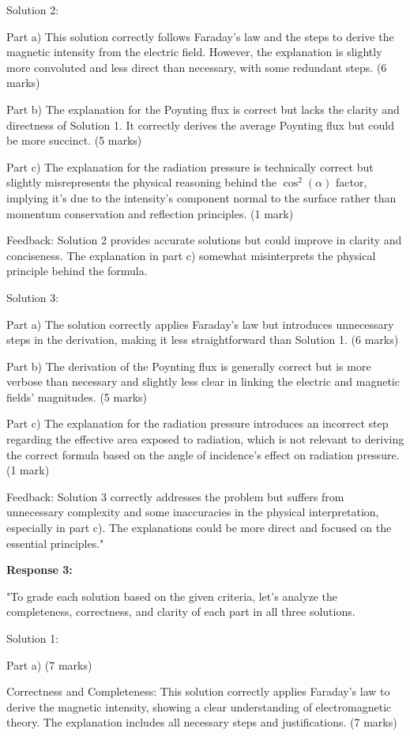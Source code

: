 \documentclass[a4paper,11pt]{article}
\begin{document}
Solution 2:

Part a) This solution correctly follows Faraday's law and the steps to derive the magnetic intensity from the electric field. However, the explanation is slightly more convoluted and less direct than necessary, with some redundant steps. (6 marks)

Part b) The explanation for the Poynting flux is correct but lacks the clarity and directness of Solution 1. It correctly derives the average Poynting flux but could be more succinct. (5 marks)

Part c) The explanation for the radiation pressure is technically correct but slightly misrepresents the physical reasoning behind the \(\cos^2(\alpha)\) factor, implying it's due to the intensity's component normal to the surface rather than momentum conservation and reflection principles. (1 mark)

Feedback: Solution 2 provides accurate solutions but could improve in clarity and conciseness. The explanation in part c) somewhat misinterprets the physical principle behind the formula.

Solution 3:

Part a) The solution correctly applies Faraday's law but introduces unnecessary steps in the derivation, making it less straightforward than Solution 1. (6 marks)

Part b) The derivation of the Poynting flux is generally correct but is more verbose than necessary and slightly less clear in linking the electric and magnetic fields' magnitudes. (5 marks)

Part c) The explanation for the radiation pressure introduces an incorrect step regarding the effective area exposed to radiation, which is not relevant to deriving the correct formula based on the angle of incidence's effect on radiation pressure. (1 mark)

Feedback: Solution 3 correctly addresses the problem but suffers from unnecessary complexity and some inaccuracies in the physical interpretation, especially in part c). The explanations could be more direct and focused on the essential principles."

\textbf{Response 3:}

"To grade each solution based on the given criteria, let's analyze the completeness, correctness, and clarity of each part in all three solutions.

Solution 1:

Part a) (7 marks)

Correctness and Completeness: This solution correctly applies Faraday's law to derive the magnetic intensity, showing a clear understanding of electromagnetic theory. The explanation includes all necessary steps and justifications. (7 marks)
\end{document}
